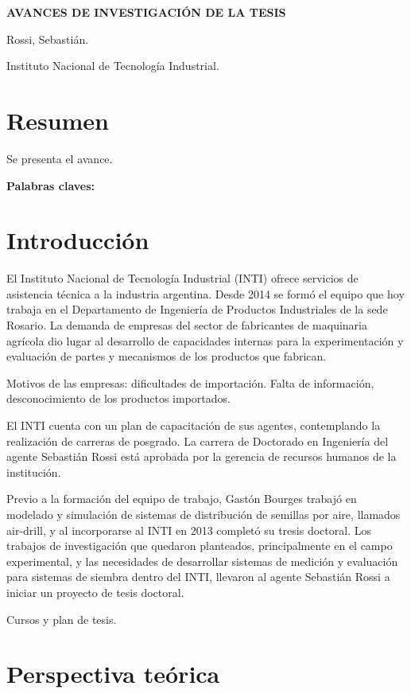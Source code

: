 \documentclass[12pt]{article}
\begin{document}
    \textbf{AVANCES DE INVESTIGACIÓN DE LA TESIS}
    
    Rossi, Sebastián.
    
    Instituto Nacional de Tecnología Industrial.
    
    \section*{Resumen}
    
    Se presenta el avance.
    
    \textbf{Palabras claves:} 
        
    \section{Introducción}
    
    El Instituto Nacional de Tecnología Industrial (INTI) \cite{inti-web} ofrece servicios de asistencia técnica a la industria argentina. Desde 2014 se formó el equipo que hoy trabaja en el Departamento de Ingeniería de Productos Industriales de la sede Rosario. La demanda de empresas del sector de fabricantes de maquinaria agrícola dio lugar al desarrollo de capacidades internas para la experimentación y evaluación de partes y mecanismos de los productos que fabrican. 
    
    Motivos de las empresas: dificultades de importación. Falta de información, desconocimiento de los productos importados.
    
    El INTI cuenta con un plan de capacitación de sus agentes, contemplando la realización de carreras de posgrado. La carrera de Doctorado en Ingeniería del agente Sebastián Rossi está aprobada por la gerencia de recursos humanos de la institución.
    
    Previo a la formación del equipo de trabajo, Gastón Bourges trabajó en modelado y simulación de sistemas de distribución de semillas por aire, llamados air-drill, y al incorporarse al INTI en 2013 completó su tresis doctoral. Los trabajos de investigación que quedaron planteados, principalmente en el campo experimental, y las necesidades de desarrollar sistemas de medición y evaluación para sistemas de siembra dentro del INTI, llevaron al agente Sebastián Rossi a iniciar un proyecto de tesis doctoral.
    
    Cursos y plan de tesis.
    
    \section{Perspectiva teórica}
    
\end{document}
